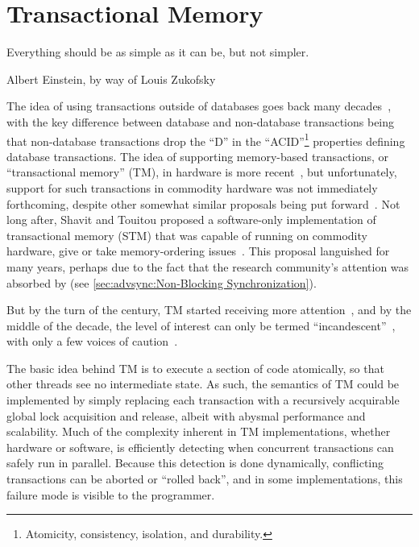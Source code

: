 
\section{Transactional Memory}
\label{sec:future:Transactional Memory}
\epigraph{Everything should be as simple as it can be, but not simpler.}
	 {Albert Einstein, by way of Louis Zukofsky}

The idea of using transactions outside of databases goes back many
decades~\cite{DBLomet1977SIGSOFT,Knight:1986:AMF:319838.319854,Herlihy93a},
with the key difference between
database and non-database transactions being that non-database transactions
drop the ``D'' in the ``ACID''\footnote{
	Atomicity, consistency, isolation, and durability.}
properties defining database transactions.
The idea of supporting memory-based transactions, or ``transactional memory''
(TM), in hardware
is more recent~\cite{Herlihy93a}, but unfortunately, support for such
transactions in commodity hardware was not immediately forthcoming,
despite other somewhat similar proposals being put forward~\cite{JMStone93}.
Not long after, Shavit and Touitou proposed a software-only implementation
of transactional memory (STM) that was capable of running on commodity
hardware, give or take memory-ordering issues~\cite{Shavit95}.
This proposal languished for many years, perhaps due to the fact that
the research community's attention was absorbed by 
(see \cref{sec:advsync:Non-Blocking Synchronization}).

But by the turn of the century, TM started receiving
more attention~\cite{Martinez01a,Rajwar01a}, and by the middle of the
decade, the level of interest can only be termed
``incandescent''~\cite{MauriceHerlihy2005-TM-manifesto.pldi,
DanGrossman2007TMGCAnalogy}, with only a few voices of
caution~\cite{Blundell2005DebunkTM,McKenney2007PLOSTM}.

The basic idea behind TM is to execute a section of
code atomically, so that other threads see no intermediate state.
As such, the semantics of TM could be implemented
by simply replacing each transaction with a recursively acquirable
global lock acquisition and release, albeit with abysmal performance
and scalability.
Much of the complexity inherent in TM implementations, whether hardware
or software, is efficiently detecting when concurrent transactions can safely
run in parallel.
Because this detection is done dynamically, conflicting transactions
can be aborted or ``rolled back'', and in some implementations, this
failure mode is visible to the programmer.

